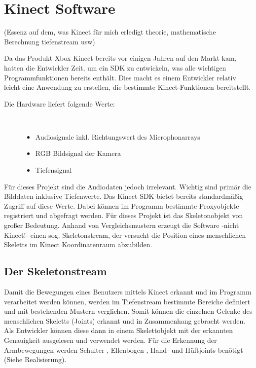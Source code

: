 \section{Kinect Software}\label{Software}

(Essenz auf dem, was Kinect für mich erledigt theorie, mathematische Berechnung tiefenstream usw)

Da das Produkt Xbox Kinect bereits vor einigen Jahren auf den Markt kam, hatten die Entwickler Zeit, um ein SDK zu entwickeln, was alle wichtigen Programmfunktionen bereits enthält. Dies macht es einem Entwickler relativ leicht eine Anwendung zu erstellen, die bestimmte Kinect-Funktionen bereitstellt. 

\begin{description}
	\item[Die Hardware liefert folgende Werte:]~\par
	\begin{itemize}
		\item Audiosignale inkl. Richtungswert des Microphonarrays
		\item RGB Bildsignal der Kamera
		\item Tiefensignal
	\end{itemize}
\end{description}

\noindent
Für dieses Projekt sind die Audiodaten jedoch irrelevant. Wichtig sind primär die Bilddaten inklusive Tiefenwerte.
Das Kinect SDK bietet bereits standardmäßig Zugriff auf diese Werte. Dabei können im Programm bestimmte Proxyobjekte registriert und abgefragt werden. Für dieses Projekt ist das Skeletonobjekt von großer Bedeutung. Anhand von Vergleichsmustern erzeugt die Software -nicht Kinect!- einen sog. Skeletonstream, der versucht die Position eines menschlichen Skeletts im Kinect Koordinatenraum abzubilden.\cite{SWB-376536934}

\subsection{Der Skeletonstream}
Damit die Bewegungen eines Benutzers mittels Kinect erkannt und im Programm verarbeitet werden können, werden im Tiefenstream bestimmte Bereiche definiert und mit bestehenden Mustern verglichen. Somit können die einzelnen Gelenke des menschlichen Skeletts (Joints) erkannt und in Zusammenhang gebracht werden. Als Entwickler können diese dann in einem Skelettobjekt mit der erkannten Genauigkeit ausgelesen und verwendet werden. Für die Erkennung der Armbewegungen werden Schulter-, Ellenbogen-, Hand- und Hüftjoints benötigt (Siehe Realisierung).

